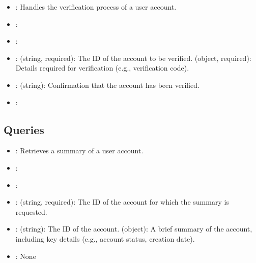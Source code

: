\documentclass[letterpaper,10pt,english]{sphinxmanual}
\begin{document}
\sphinxAtStartPar
{}
\begin{itemize}
\item {} 
\sphinxAtStartPar
{}: Handles the verification process of a user account.

\item {} 
\sphinxAtStartPar
{}: 

\item {} 
\sphinxAtStartPar
{}: 

\item {} 
\sphinxAtStartPar
{}:
\sphinxhyphen{}  (string, required): The ID of the account to be verified.
\sphinxhyphen{}  (object, required): Details required for verification (e.g., verification code).

\item {} 
\sphinxAtStartPar
{}:
\sphinxhyphen{}  (string): Confirmation that the account has been verified.

\item {} 
\sphinxAtStartPar
{}: 

\end{itemize}


\subsection{Queries}
\label{\detokenize{crm_system/accounts_summary_service:queries}}
\sphinxAtStartPar
{}
\begin{itemize}
\item {} 
\sphinxAtStartPar
{}: Retrieves a summary of a user account.

\item {} 
\sphinxAtStartPar
{}: 

\item {} 
\sphinxAtStartPar
{}: 

\item {} 
\sphinxAtStartPar
{}:
\sphinxhyphen{}  (string, required): The ID of the account for which the summary is requested.

\item {} 
\sphinxAtStartPar
{}:
\sphinxhyphen{}  (string): The ID of the account.
\sphinxhyphen{}  (object): A brief summary of the account, including key details (e.g., account status, creation date).

\item {} 
\sphinxAtStartPar
{}: None

\end{itemize}
\end{document}
